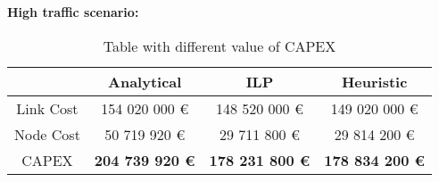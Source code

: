 \vspace{11pt}
\textbf{High traffic scenario:}\\

\begin{table}[h!]
\centering
\begin{tabular}{| c | c | c | c |}
 \hline
   & Analytical & ILP & Heuristic \\
 \hline\hline
 Link Cost & 154 020 000 \euro & 148 520 000 \euro & 149 020 000 \euro \\
 Node Cost & 50 719 920 \euro & 29 711 800 \euro & 29 814 200 \euro \\
 CAPEX & \textbf{204 739 920 \euro} & \textbf{178 231 800 \euro} & \textbf{178 834 200 \euro} \\
 \hline
\end{tabular}
\caption{Table with different value of CAPEX }
\label{table_comparative_opaque_sur_ref_3}
\end{table}


